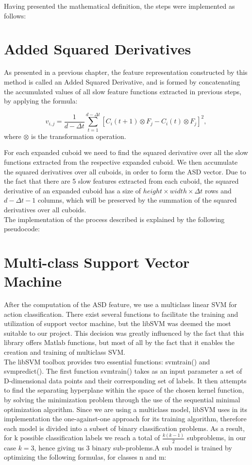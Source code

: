 \documentclass[11pt]{report}
\begin{document}
Having presented the mathematical definition, the steps were implemented as follows:

\section{Added Squared Derivatives}
As presented in a previous chapter, the feature representation constructed by this method is called an Added Squared Derivative, and is formed by concatenating the accumulated values of all slow feature functions extracted in previous steps, by applying the formula:

\begin{equation}
v_{i,j} = \frac{1}{d-\Delta t} \sum_{t = 1}^{d-\Delta t}[C_i(t+1) \otimes F_j - C_i(t) \otimes F_j]^2, 
\end{equation}
where \(\otimes\) is the transformation operation. 

For each expanded cuboid we need to find the squared derivative over all the slow functions extracted from the respective expanded cuboid. We then accumulate the squared derivatives over all cuboids, in order to form the ASD vector. Due to the fact that there are 5 slow features extracted from each cuboid, the squared derivative of an expanded cuboid has a size of \(height \times width \times \Delta t\) rows and \(d - \Delta t - 1\) columns, which will be preserved by the summation of the squared derivatives over all cuboids.\\
The implementation of the process described is explained by the following pseudocode:


\section{Multi-class Support Vector Machine}
After the computation of the ASD feature, we use a multiclass linear SVM for action classification. There exist several functions to facilitate the training and utilization of support vector machine, but the libSVM was deemed the most suitable to our project. This decision was greatly influenced by the fact that this library offers Matlab functions, but most of all by the fact that it enables the creation and training of multiclass SVM.\\ 
The libSVM toolbox provides two essential functions: svmtrain() and svmpredict(). The first function svmtrain() takes as an input parameter a set of D-dimensional data points and their corresponding set of labels. It then attempts to find the separating hyperplane within the space of the chosen kernel function, by solving the minimization problem through the use of the sequential minimal optimization algorithm. Since we are using a multiclass model, libSVM uses in its implementation the one-against-one approach for its training algorithm, therefore each model is divided into a subset of binary classification problems. As a result, for k possible classification labels we reach a total of \(\frac{k(k-1)}{2}\) subproblems, in our case \(k = 3\), hence giving us 3 binary sub-problems.A sub model is trained by optimizing the following formulas, for classes n and m:
\end{document}
